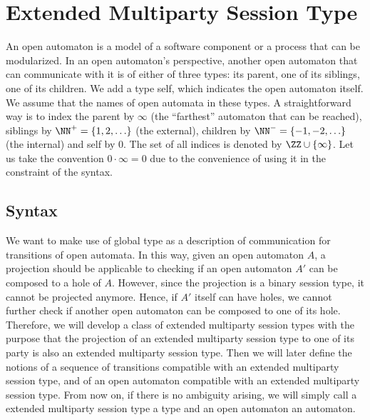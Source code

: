 \section{Extended Multiparty Session Type}

An open automaton is a model of a software component or a process that can be modularized. In an open automaton's perspective, another open automaton that can communicate with it is of either of three types: its parent, one of its siblings, one of its children. We add a type self, which indicates the open automaton itself. We assume that the names of open automata in these types. A straightforward way is to index the parent by $\infty$ (the ``farthest'' automaton that can be reached), siblings by $\NN^+=\{1,2,\ldots\}$ (the external), children by $\NN^{-}=\{-1, -2,\ldots\}$ (the internal) and self by $0$. The set of all indices is denoted by $\ZZ\cup\{\infty\}$. Let us take the convention $0\cdot\infty = 0$ due to the convenience of using it in the constraint of the syntax.

\subsection{Syntax}

We want to make use of global type as a description of communication for transitions of open automata. In this way, given an open automaton $A$, a projection should be applicable to checking if an open automaton $A'$ can be composed to a hole of $A$. However, since the projection is a binary session type, it cannot be projected anymore. Hence, if $A'$ itself can have holes, we cannot further check if another open automaton can be composed to one of its hole. Therefore, we will develop a class of extended multiparty session types with the purpose that the projection of an extended multiparty session type to one of its party is also an extended multiparty session type. Then we will later define the notions of a sequence of transitions compatible with an extended multiparty session type, and of an open automaton compatible with an extended multiparty session type. From now on, if there is no ambiguity arising, we will simply call a extended multiparty session type a type and an open automaton an automaton.


